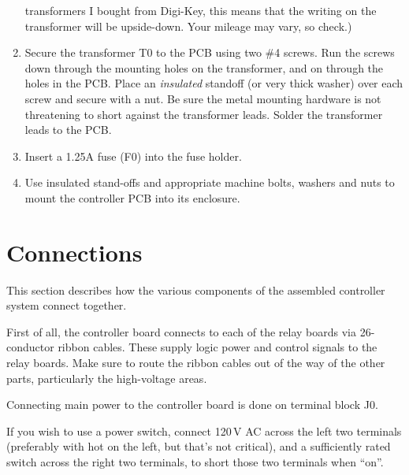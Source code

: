 \documentclass[12pt]{article}
\begin{document}
\begin{enumerate}
	   transformers I bought from Digi-Key, this means that the writing on
	   the transformer will be upside-down.  Your mileage may vary, so check.)
 \item Secure the transformer T0 to the PCB using
       two \#4 screws.  Run the screws down through
	   the mounting holes on the transformer, and on through the holes in the
	   PCB.  Place an \emph{insulated} standoff (or very thick washer) over 
	   each screw and secure with a
	   nut.  Be sure the metal mounting hardware is not threatening to short
	   against the transformer leads.  %
	   Solder the transformer leads to the PCB.
 \item Insert a 1.25A fuse (F0) into the fuse holder.
 \item Use insulated stand-offs and appropriate machine bolts, washers and
       nuts to mount the controller PCB into its enclosure.
\end{enumerate}

\section{Connections}
This section describes how the various components of the assembled controller
system connect together.  

First of all, the controller board connects to each of the relay boards via
26-conductor ribbon cables.  These supply logic power and control signals
to the relay boards.  Make sure to route the ribbon cables out of the way of
the other parts, particularly the high-voltage areas.

Connecting main power to the controller board is done on terminal block J0.


If you wish to use a power switch, connect 120\,V AC across the left two
terminals (preferably with hot on the left, but that's not critical), and a
sufficiently rated switch across the right two terminals, to short those two
terminals when ``on''.
\end{document}
